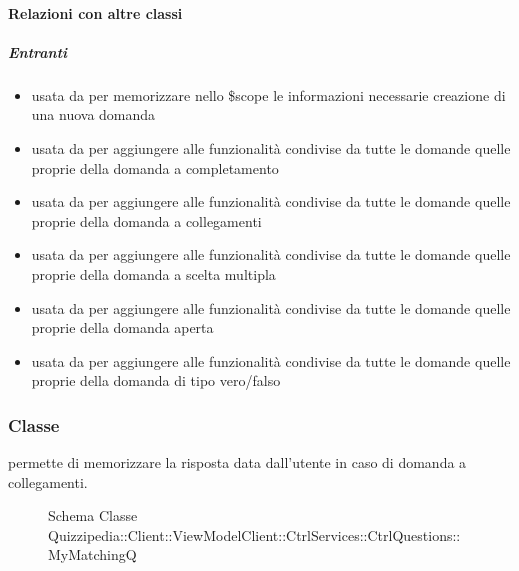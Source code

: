 \paragraph{Relazioni con altre classi}
\subparagraph{Entranti}
\begin{itemize}
\item usata da  per memorizzare nello \$scope le informazioni necessarie creazione di una nuova domanda
\item usata da  per aggiungere alle funzionalità condivise da tutte le domande quelle proprie della domanda a completamento
\item usata da  per aggiungere alle funzionalità condivise da tutte le domande quelle proprie della domanda a collegamenti
\item usata da  per aggiungere alle funzionalità condivise da tutte le domande quelle proprie della domanda a scelta multipla
\item usata da  per aggiungere alle funzionalità condivise da tutte le domande quelle proprie della domanda aperta
\item usata da  per aggiungere alle funzionalità condivise da tutte le domande quelle proprie della domanda di tipo vero/falso
\end{itemize}
\subsubsection{Classe }
permette di memorizzare la risposta data dall'utente in caso di domanda a collegamenti.
\begin{figure}[H]
\centering
\noindent{}
\caption[Schema Classe MyMatchingQ]{Schema Classe Quizzipedia::Client::ViewModelClient::CtrlServices::CtrlQuestions::MyMatchingQ}
\end{figure}
